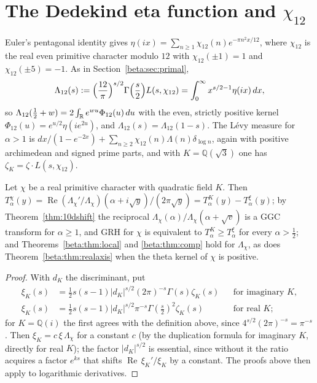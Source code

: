 \section{The Dedekind eta function and \texorpdfstring{$\chi_{12}$}{chi 12}}\label{beta:sec:eta}

Euler's pentagonal identity gives $\eta(ix)=\sum_{n\ge1}\chi_{12}(n)e^{-\pi n^2x/12}$, where $\chi_{12}$ is the real even primitive character modulo $12$ with $\chi_{12}(\pm1)=1$ and $\chi_{12}(\pm5)=-1$. As in Section~\ref{beta:sec:primal},
\[
\Lambda_{12}(s):=\Bigl(\frac{12}{\pi}\Bigr)^{s/2}\Gamma\Bigl(\frac s2\Bigr)L(s,\chi_{12})
=\int_0^\infty x^{s/2-1}\eta(ix)\,dx,
\]
so $\Lambda_{12}(\tfrac12+w)=2\int_{\mathbb{R}}e^{wu}\Phi_{12}(u)\,du$ with the even, strictly positive kernel $\Phi_{12}(u)=e^{u/2}\eta(ie^{2u})$, and $\Lambda_{12}(s)=\Lambda_{12}(1-s)$. The L\'evy measure for $\alpha>1$ is $dx/(1-e^{-2x})+\sum_{n\ge2}\chi_{12}(n)\Lambda(n)\delta_{\log n}$, again with positive archimedean and signed prime parts, and with $K=\mathbb Q(\sqrt3)$ one has $\zeta_K=\zeta\cdot L(s,\chi_{12})$.

\begin{theorem}\label{beta:thm:realchar}
Let $\chi$ be a real primitive character with quadratic field $K$. Then $T^\chi_\alpha(y)=\operatorname{Re}(\Lambda_\chi'/\Lambda_\chi)(\alpha+i\sqrt y)/(2\pi\sqrt y)=T^K_\alpha(y)-T^\xi_\alpha(y)$; by Theorem~\ref{thm:10dshift} the reciprocal $\Lambda_\chi(\alpha)/\Lambda_\chi(\alpha+\sqrt v)$ is a GGC transform for $\alpha\ge1$, and GRH for $\chi$ is equivalent to $T^K_\alpha\ge T^\xi_\alpha$ for every $\alpha>\tfrac12$; and Theorems~\ref{beta:thm:local} and \ref{beta:thm:comp} hold for $\Lambda_\chi$, as does Theorem~\ref{beta:thm:realaxis} when the theta kernel of $\chi$ is positive.
\end{theorem}

\begin{proof}
With $d_K$ the discriminant, put
\begin{align*}
\xi_K(s)&=\tfrac12s(s-1)|d_K|^{s/2}(2\pi)^{-s}\Gamma(s)\zeta_K(s)&&\text{for imaginary $K$},\\
\xi_K(s)&=\tfrac12s(s-1)|d_K|^{s/2}\pi^{-s}\Gamma(\tfrac s2)^2\zeta_K(s)&&\text{for real $K$};
\end{align*}
for $K=\mathbb Q(i)$ the first agrees with the definition above, since $4^{s/2}(2\pi)^{-s}=\pi^{-s}$. Then $\xi_K=c\,\xi\,\Lambda_\chi$ for a constant $c$ (by the duplication formula for imaginary $K$, directly for real $K$); the factor $|d_K|^{s/2}$ is essential, since without it the ratio acquires a factor $e^{ks}$ that shifts $\operatorname{Re}\,\xi_K'/\xi_K$ by a constant. The proofs above then apply to logarithmic derivatives.
\end{proof}

